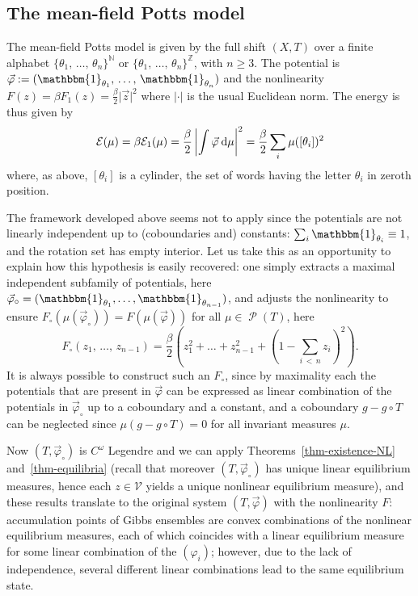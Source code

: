 \documentclass[10pt]{amsart}
\theoremstyle{definition}\newtheorem{defi}[theo]{Definition}\newtheorem{rema}[theo]{Remark}\newtheorem{exam}[theo]{Example}\newtheorem{exem}[theo]{Example}\newtheorem{nota}[theo]{Notation}
\theoremstyle{plain}
\theoremstyle{plain}
\newcommand\Prob{{\operatorname{\mathscr{P}}}}
\newcommand*{\dd} {\relax\ifnum\lastnodetype>0\mskip\medmuskip\fi\mathrm{d}}
\newcommand{\pot}{\varphi}
\newcommand*\8{\infty}
\newcommand*\N{\mathbb{N}}
\newcommand{\Z}{\mathbb{Z}}
\newcommand{\En}{\mathcal{E}}
\newcommand{\scV}{\mathscr{V}}
\begin{document}
\subsection{The mean-field Potts model}\label{subsec:potts}

The mean-field Potts model is given by the full shift $(X,T)$ over a finite alphabet $\{\theta_{1},\,\ldots,\,\theta_{n}\}^{\N}$ or $\{\theta_{1},\,\ldots,\,\theta_{n}\}^{\Z}$, with $n\geq3$. The potential is $\vec\pot:=(\mathbbm{1}_{\theta_{1}},\,\ldots,\,\mathbbm{1}_{\theta_{n}})$ and the nonlinearity $F(z)=\beta F_1(z)=\frac\beta2 \lvert \vec z\rvert^2$ where $\lvert\cdot\rvert$ is the usual Euclidean norm. The energy is thus given by
\[
\En(\mu) = \beta\En_1(\mu)=\frac\beta2 \left\lvert\int \vec\pot \dd\mu\right\rvert^2 = \frac\beta2 \sum_i \mu([\theta_i])^2
\]
where, as above, $[\theta_i]$ is a cylinder, the set of words having the letter $\theta_i$ in zeroth position.

The framework developed above seems not to apply since the potentials are not linearly independent up to (coboundaries and) constants: $\sum_i \mathbbm{1}_{\theta_{i}} \equiv 1$, and the rotation set has empty interior. Let us take this as an opportunity to explain how this hypothesis is easily recovered: one simply extracts a maximal independent subfamily of potentials, here $\vec\pot_\circ = (\mathbbm{1}_{\theta_{1}},\ldots, \mathbbm{1}_{\theta_{n-1}})$, and adjusts the nonlinearity to ensure $F_\circ(\mu(\vec\pot_\circ))=F(\mu(\vec\pot))$ for all $\mu\in\Prob(T)$, here
\[
F_\circ(z_1,\,\dots,\,z_{n-1}) = \frac\beta2 \left(z_1^2+\dots+z_{n-1}^2+\left(1-\sum_{i\,<\,n} z_i\right)^2\right).
\]
It is always possible to construct such an $F_\circ$, since by maximality each the potentials that are present in $\vec \pot$ can be expressed as linear combination of the potentials in $\vec\pot_\circ$ up to a coboundary and a constant, and a coboundary $g-g\circ T$ can be neglected since $\mu(g-g\circ T)=0$ for all invariant measures $\mu$.

Now $(T,\vec\pot_\circ)$ is {$C^\omega$ Legendre} and we can apply Theorems~\ref{thm-existence-NL} and~\ref{thm-equilibria} (recall that moreover $(T,\vec\pot_\circ)$ has unique linear equilibrium measures, hence each $z\in\scV$ yields a unique nonlinear equilibrium measure), and these results translate to the original system $(T,\vec\pot)$ with the nonlinearity $F$: accumulation points of Gibbs ensembles are convex combinations of the nonlinear equilibrium measures, each of which coincides with a linear equilibrium measure for some linear combination of the $(\pot_i)$; however, due to the lack of independence, several different linear combinations lead to the same equilibrium state.
\end{document}
